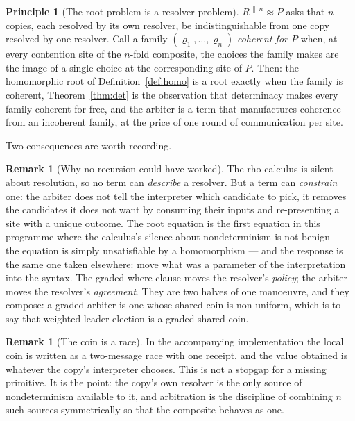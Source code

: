 \documentclass[11pt]{article}
\theoremstyle{definition}
\newtheorem{remark}[theorem]{Remark}
\newtheorem{principle}[theorem]{Principle}
\newcommand{\rhoc}{rho calculus}
\newcommand{\parn}[1]{{#1}^{\,\|\,n}}
\begin{document}
\begin{principle}[The root problem is a resolver problem]
$\parn{R} \approx P$ asks that $n$ copies, each resolved by its own resolver, be indistinguishable from one copy resolved by one resolver. Call a family $(\varrho_1, \ldots, \varrho_n)$ \emph{coherent for $P$} when, at every contention site of the $n$-fold composite, the choices the family makes are the image of a single choice at the corresponding site of $P$. Then: the homomorphic root of Definition~\ref{def:homo} is a root exactly when the family is coherent, Theorem~\ref{thm:det} is the observation that determinacy makes every family coherent for free, and the arbiter is a term that manufactures coherence from an incoherent family, at the price of one round of communication per site.
\end{principle}

Two consequences are worth recording.

\begin{remark}[Why no recursion could have worked]
The \rhoc{} is silent about resolution, so no term can \emph{describe} a resolver. But a term can \emph{constrain} one: the arbiter does not tell the interpreter which candidate to pick, it removes the candidates it does not want by consuming their inputs and re-presenting a site with a unique outcome. The root equation is the first equation in this programme where the calculus's silence about nondeterminism is not benign --- the equation is simply unsatisfiable by a homomorphism --- and the response is the same one taken elsewhere: move what was a parameter of the interpretation into the syntax. The graded where-clause moves the resolver's \emph{policy}; the arbiter moves the resolver's \emph{agreement}. They are two halves of one manoeuvre, and they compose: a graded arbiter is one whose shared coin is non-uniform, which is to say that weighted leader election is a graded shared coin.
\end{remark}

\begin{remark}[The coin is a race]
In the accompanying implementation the local coin is written as a two-message race with one receipt, and the value obtained is whatever the copy's interpreter chooses. This is not a stopgap for a missing primitive. It is the point: the copy's own resolver is the only source of nondeterminism available to it, and arbitration is the discipline of combining $n$ such sources symmetrically so that the composite behaves as one.
\end{remark}
\end{document}
